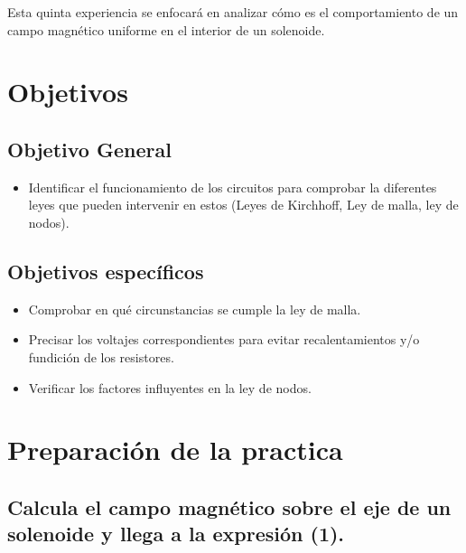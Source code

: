 \documentclass[letterpaper, 12pt]{article}
\begin{document}
\begin{multicols}{2}
	Esta quinta experiencia se enfocará en analizar cómo es el comportamiento
	de un campo magnético uniforme en el interior de un solenoide.

	\section{Objetivos}

	\subsection{Objetivo General}

	\begin{itemize}
		\item Identificar el funcionamiento de los circuitos para comprobar
		      la diferentes leyes que pueden intervenir en estos
		      (Leyes de Kirchhoff, Ley de malla, ley de nodos).
	\end{itemize}

	\subsection{Objetivos específicos}

	\begin{itemize}
		\item Comprobar en qué circunstancias se cumple la ley de malla.
		\item Precisar los voltajes correspondientes para evitar
		      recalentamientos y/o fundición de los resistores.
		\item Verificar  los factores influyentes en la ley de nodos.
	\end{itemize}

	\section{Preparación de la practica}

	\subsection*{Calcula el campo magnético sobre el eje de un solenoide y llega a la expresión (1).}


\end{multicols}
\end{document}
